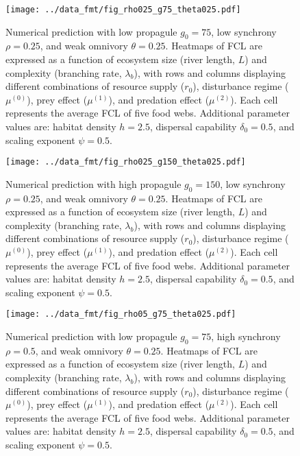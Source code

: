 \begin{figure}
\centering
\texttt{[image: ../data\_fmt/fig\_rho025\_g75\_theta025.pdf]}
\caption{\label{fig:fig-num1}Numerical prediction with low propagule
\(g_0 = 75\), low synchrony \(\rho = 0.25\), and weak omnivory
\(\theta = 0.25\). Heatmaps of FCL are expressed as a function of
ecosystem size (river length, \(L\)) and complexity (branching rate,
\(\lambda_b\)), with rows and columns displaying different combinations
of resource supply (\(r_0\)), disturbance regime (\(\mu^{(0)}\)), prey
effect (\(\mu^{(1)}\)), and predation effect (\(\mu^{(2)}\)). Each cell
represents the average FCL of five food webs. Additional parameter
values are: habitat density \(h=2.5\), dispersal capability
\(\delta_0=0.5\), and scaling exponent \(\psi=0.5\).}
\end{figure}

\newpage

\begin{figure}
\centering
\texttt{[image: ../data\_fmt/fig\_rho025\_g150\_theta025.pdf]}
\caption{\label{fig:fig-num2}Numerical prediction with high propagule
\(g_0 = 150\), low synchrony \(\rho = 0.25\), and weak omnivory
\(\theta = 0.25\). Heatmaps of FCL are expressed as a function of
ecosystem size (river length, \(L\)) and complexity (branching rate,
\(\lambda_b\)), with rows and columns displaying different combinations
of resource supply (\(r_0\)), disturbance regime (\(\mu^{(0)}\)), prey
effect (\(\mu^{(1)}\)), and predation effect (\(\mu^{(2)}\)). Each cell
represents the average FCL of five food webs. Additional parameter
values are: habitat density \(h=2.5\), dispersal capability
\(\delta_0=0.5\), and scaling exponent \(\psi=0.5\).}
\end{figure}

\newpage

\begin{figure}
\centering
\texttt{[image: ../data\_fmt/fig\_rho05\_g75\_theta025.pdf]}
\caption{\label{fig:fig-num3}Numerical prediction with low propagule
\(g_0 = 75\), high synchrony \(\rho = 0.5\), and weak omnivory
\(\theta = 0.25\). Heatmaps of FCL are expressed as a function of
ecosystem size (river length, \(L\)) and complexity (branching rate,
\(\lambda_b\)), with rows and columns displaying different combinations
of resource supply (\(r_0\)), disturbance regime (\(\mu^{(0)}\)), prey
effect (\(\mu^{(1)}\)), and predation effect (\(\mu^{(2)}\)). Each cell
represents the average FCL of five food webs. Additional parameter
values are: habitat density \(h=2.5\), dispersal capability
\(\delta_0=0.5\), and scaling exponent \(\psi=0.5\).}
\end{figure}

